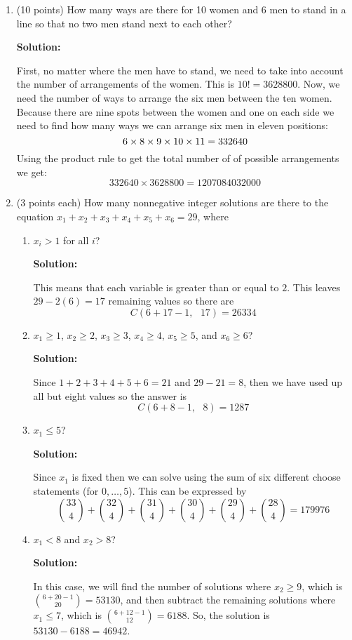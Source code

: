 \documentclass[11pt]{article}
\begin{document}
\begin{enumerate}
\begin{enumerate}
\end{enumerate}

\item (10 points) How many ways are there for 10 women and 6 men to 
stand in a line so that no two men stand next to each other?

\textbf{Solution: }

First, no matter where the men have to stand, we need to take into account the number of arrangements of the women.  This is $10! = 3628800$.  Now, we need the number of ways to arrange the six men between the ten women.  Because there are nine spots between the women and one on each side we need to find how many ways we can arrange six men in eleven positions:
$$ 6 \time 7 \times 8 \times 9 \times 10 \times 11 = 332640 $$
Using the product rule to get the total number of of possible arrangements we get:
$$ 332640 \times 3628800 = 1207084032000 $$

\item (3 points each) 
How many nonnegative integer solutions are there to the equation 
$x_1+x_2+x_3+x_4+x_5+x_6=29$, where
\begin{enumerate}
\item $x_i>1$ for all $i$? 

\textbf{Solution: }

This means that each variable is greater than or equal to $2$.  This leaves $29 - 2(6) = 17$ remaining values so there are 
$$ C(6 + 17 - 1,\text{ }17) = 26334 $$

\item $x_1\ge1$, $x_2\ge2$, $x_3\ge3$, $x_4\ge4$, $x_5\ge5$, and $x_6\ge6$? 

\textbf{Solution: }

Since $1 + 2 + 3 + 4 + 5 + 6 = 21$ and $29 - 21 = 8$, then we have used up all but eight values so the answer is
$$ C(6 + 8 - 1,\text{ }8) = 1287 $$

\item $x_1\le 5$?

\textbf{Solution: }

Since $x_1$ is fixed then we can solve using the sum of six different choose statements (for $0,\ldots, 5$).  This can be expressed by 
$$ {33 \choose 4} + {32 \choose 4} + {31 \choose 4} + {30 \choose 4} + {29 \choose 4} + {28 \choose 4} = 179976 $$

\item $x_1<8$ and $x_2>8$? 

\textbf{Solution: }

In this case, we will find the number of solutions where $x_2 \geq 9$, which is ${6 + 20 - 1 \choose 20} = 53130$, and then subtract the remaining solutions where $x_1 \leq 7$, which is ${6 + 12 - 1 \choose 12} = 6188$.  So, the solution is $53130 - 6188 = 46942$.  

\end{enumerate}


\end{enumerate}
\end{document}
